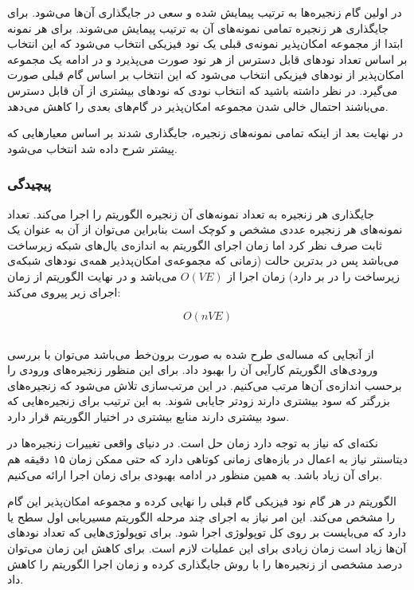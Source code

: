 در اولین گام زنجیره‌ها به ترتیب پیمایش  شده و سعی در جایگذاری آن‌ها می‌شود.
برای جایگذاری هر زنجیره تمامی نمونه‌های آن به ترتیب پیمایش می‌شوند.
برای هر نمونه ابتدا از مجموعه امکان‌پذیر نمونه‌ی قبلی یک نود فیزیکی انتخاب می‌شود که این انتخاب بر اساس تعداد نودهای قابل دسترس از هر نود صورت می‌پذیرد و
در ادامه یک مجموعه امکان‌پذیر از نودهای فیزیکی انتخاب می‌شود که این انتخاب بر اساس گام قبلی صورت می‌گیرد.
در نظر داشته باشید که انتخاب نودی که نودهای بیشتری از آن قابل دسترس می‌باشند احتمال خالی شدن مجموعه امکان‌پذیر در گام‌های بعدی را کاهش می‌دهد.

در نهایت بعد از اینکه تمامی نمونه‌های زنجیره، جایگذاری شدند  بر اساس معیارهایی که پیشتر شرح داده شد انتخاب می‌شود.

\subsubsection{پیچیدگی}

جایگذاری هر زنجیره به تعداد نمونه‌های آن زنجیره الگوریتم  را اجرا می‌کند.
تعداد نمونه‌های هر زنجیره عددی مشخص و کوچک است بنابراین می‌توان از آن به عنوان یک ثابت صرف نظر کرد
اما زمان اجرای الگوریتم  به اندازه‌ی یال‌های شبکه زیرساخت می‌باشد
پس در بدترین حالت (زمانی که مجموعه‌ی امکان‌پدذیر همه‌ی نودهای شبکه‌ی زیرساخت را در بر دارد)‌ زمان اجرا از
\(O(VE)\)
می‌باشد و در نهایت الگوریتم از زمان اجرای زیر پیروی می‌کند:

$$
O(nVE)
$$

\subsection{}

از آنجایی که مساله‌ی طرح شده به صورت برون‌خط می‌باشد می‌توان با بررسی ورودی‌های الگوریتم کارآیی آن را بهبود داد.
برای این منظور زنجیره‌های ورودی را برحسب اندازه‌ی آن‌ها مرتب می‌کنیم.
در این مرتب‌سازی تلاش می‌شود که زنجیره‌های بزرگتر که سود بیشتری دارند زودتر جایابی شوند.
به این ترتیب برای زنجیره‌هایی که سود بیشتری دارند منابع بیشتری در اختیار الگوریتم قرار دارد.

نکته‌ای که نیاز به توجه دارد زمان حل است. در دنیای واقعی تغییرات زنجیره‌ها در دیتاسنتر نیاز به اعمال در بازه‌های زمانی کوتاهی دارد که
حتی ممکن زمان ۱۵ دقیقه هم برای آن زیاد باشد.
به همین منظور در ادامه بهبودی برای زمان اجرا ارائه می‌کنیم.

الگوریتم  در هر گام نود فیزیکی گام قبلی را نهایی کرده و مجموعه امکان‌پذیر این گام را مشخص می‌کند.
این امر نیاز به اجرای چند مرحله الگوریتم مسیریابی اول سطح یا  دارد که
می‌بایست بر روی کل توپولوژی اجرا شود.
برای توپولوژی‌هایی که تعداد نودهای آن‌ها زیاد است زمان زیادی برای این عملیات لازم است.
برای کاهش این زمان می‌توان درصد مشخصی از زنجیره‌ها را با روش  جایگذاری کرده و زمان اجرا الگوریتم را کاهش داد.

